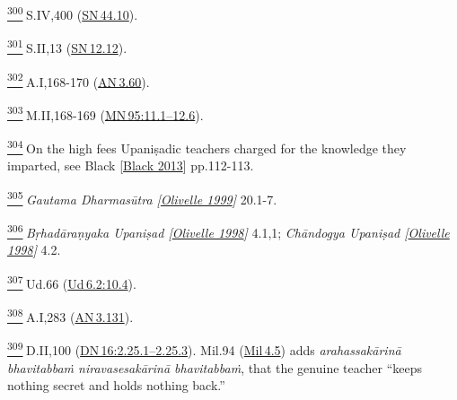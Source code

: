 \label{footprints_split_024.html_fn300}
\hyperref[footprints_split_010.htmlux5cux23fnref300]{\textsuperscript{300}} S.IV,400
(\href{https://suttacentral.net/sn44.10/en/sujato}{SN\,44.10}).

\label{footprints_split_024.html_fn301}
\hyperref[footprints_split_010.htmlux5cux23fnref301]{\textsuperscript{301}} S.II,13
(\href{https://suttacentral.net/sn12.12/en/sujato}{SN\,12.12}).

\label{footprints_split_024.html_fn302}
\hyperref[footprints_split_010.htmlux5cux23fnref302]{\textsuperscript{302}} A.I,168-170
(\href{https://suttacentral.net/an3.60/en/sujato}{AN\,3.60}).

\label{footprints_split_024.html_fn303}
\hyperref[footprints_split_010.htmlux5cux23fnref303]{\textsuperscript{303}} M.II,168-169
(\href{https://suttacentral.net/mn95/en/sujato\#11.1}{MN\,95:11.1--12.6}).

\label{footprints_split_024.html_fn304}
\hyperref[footprints_split_010.htmlux5cux23fnref304]{\textsuperscript{304}} On
the high fees Upaniṣadic teachers charged for the knowledge they
imparted, see {Black
{{[}\hyperref[footprints_split_022.htmlux5cux23Blackux5cux25202013]{Black
2013}{]}}} pp.112-113.

\label{footprints_split_024.html_fn305}
\hyperref[footprints_split_010.htmlux5cux23fnref305]{\textsuperscript{305}} \emph{{Gautama
Dharmasūtra
{{[}\hyperref[footprints_split_022.htmlux5cux23Olivelleux5cux25201999]{Olivelle
1999}{]}}}} 20.1-7.

\label{footprints_split_024.html_fn306}
\hyperref[footprints_split_010.htmlux5cux23fnref306]{\textsuperscript{306}} \emph{{Bṛhadāraṇyaka
Upaniṣad
{{[}\hyperref[footprints_split_022.htmlux5cux23Olivelleux5cux25201998]{Olivelle
1998}{]}}}} 4.1,1; \emph{{Chāndogya Upaniṣad
{{[}\hyperref[footprints_split_022.htmlux5cux23Olivelleux5cux25201998]{Olivelle
1998}{]}}}} 4.2.

\label{footprints_split_024.html_fn307}
\hyperref[footprints_split_010.htmlux5cux23fnref307]{\textsuperscript{307}} Ud.66
(\href{https://suttacentral.net/ud6.2/en/sujato\#10.4}{Ud\,6.2:10.4}).

\label{footprints_split_024.html_fn308}
\hyperref[footprints_split_010.htmlux5cux23fnref308]{\textsuperscript{308}} A.I,283
(\href{https://suttacentral.net/an3.131/en/sujato}{AN\,3.131}).

\label{footprints_split_024.html_fn309}
\hyperref[footprints_split_010.htmlux5cux23fnref309]{\textsuperscript{309}} D.II,100
(\href{https://suttacentral.net/dn16/en/sujato\#2.25.1}{DN\,16:2.25.1--2.25.3}).
Mil.94 (\href{https://suttacentral.net/mil4.5}{Mil\,4.5}) adds
\emph{arahassakārinā bhavitabbaṁ niravasesakārinā bhavitabbaṁ}, that the
genuine teacher ``keeps nothing secret and holds nothing back.''

